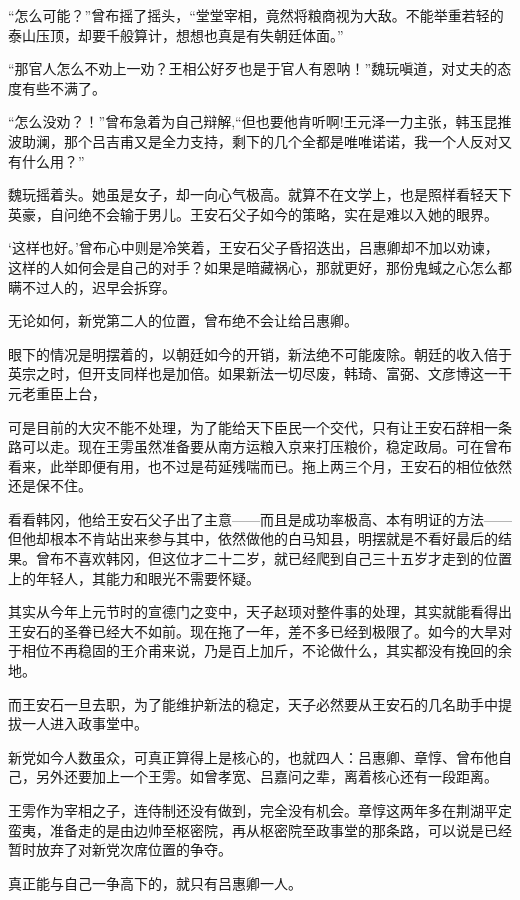 “怎么可能？”曾布摇了摇头，“堂堂宰相，竟然将粮商视为大敌。不能举重若轻的泰山压顶，却要千般算计，想想也真是有失朝廷体面。”

“那官人怎么不劝上一劝？王相公好歹也是于官人有恩呐！”魏玩嗔道，对丈夫的态度有些不满了。

“怎么没劝？！”曾布急着为自己辩解,“但也要他肯听啊!王元泽一力主张，韩玉昆推波助澜，那个吕吉甫又是全力支持，剩下的几个全都是唯唯诺诺，我一个人反对又有什么用？”

魏玩摇着头。她虽是女子，却一向心气极高。就算不在文学上，也是照样看轻天下英豪，自问绝不会输于男儿。王安石父子如今的策略，实在是难以入她的眼界。

‘这样也好。’曾布心中则是冷笑着，王安石父子昏招迭出，吕惠卿却不加以劝谏，这样的人如何会是自己的对手？如果是暗藏祸心，那就更好，那份鬼蜮之心怎么都瞒不过人的，迟早会拆穿。

无论如何，新党第二人的位置，曾布绝不会让给吕惠卿。

眼下的情况是明摆着的，以朝廷如今的开销，新法绝不可能废除。朝廷的收入倍于英宗之时，但开支同样也是加倍。如果新法一切尽废，韩琦、富弼、文彦博这一干元老重臣上台，

可是目前的大灾不能不处理，为了能给天下臣民一个交代，只有让王安石辞相一条路可以走。现在王雱虽然准备要从南方运粮入京来打压粮价，稳定政局。可在曾布看来，此举即便有用，也不过是苟延残喘而已。拖上两三个月，王安石的相位依然还是保不住。

看看韩冈，他给王安石父子出了主意——而且是成功率极高、本有明证的方法——但他却根本不肯站出来参与其中，依然做他的白马知县，明摆就是不看好最后的结果。曾布不喜欢韩冈，但这位才二十二岁，就已经爬到自己三十五岁才走到的位置上的年轻人，其能力和眼光不需要怀疑。

其实从今年上元节时的宣德门之变中，天子赵顼对整件事的处理，其实就能看得出王安石的圣眷已经大不如前。现在拖了一年，差不多已经到极限了。如今的大旱对于相位不再稳固的王介甫来说，乃是百上加斤，不论做什么，其实都没有挽回的余地。

而王安石一旦去职，为了能维护新法的稳定，天子必然要从王安石的几名助手中提拔一人进入政事堂中。

新党如今人数虽众，可真正算得上是核心的，也就四人：吕惠卿、章惇、曾布他自己，另外还要加上一个王雱。如曾孝宽、吕嘉问之辈，离着核心还有一段距离。

王雱作为宰相之子，连侍制还没有做到，完全没有机会。章惇这两年多在荆湖平定蛮夷，准备走的是由边帅至枢密院，再从枢密院至政事堂的那条路，可以说是已经暂时放弃了对新党次席位置的争夺。

真正能与自己一争高下的，就只有吕惠卿一人。

